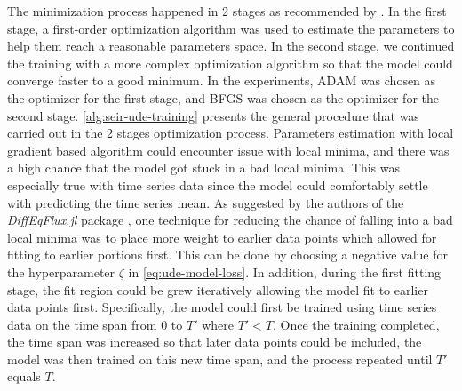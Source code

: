 The minimization process happened in 2 stages as recommended by \cite{rackauckasUniversalDifferentialEquations2020}.
In the first stage, a first-order optimization algorithm was used to estimate the parameters to help them reach a reasonable parameters space.
In the second stage, we continued the training with a more complex optimization algorithm so that the model could converge faster to a good minimum.
In the experiments, ADAM \cite{kingmaAdamMethodStochastic2017} was chosen as the optimizer for the first stage, and BFGS \cite{broydenConvergenceClassDoublerank1970, fletcherNewApproachVariable1970, goldfarbFamilyVariablemetricMethods1970, shannoConditioningQuasiNewtonMethods1970} was chosen as the optimizer for the second stage.
\autoref{alg:seir-ude-training} presents the general procedure that was carried out in the 2 stages optimization process.
Parameters estimation with local gradient based algorithm could encounter issue with local minima, and there was a high chance that the model got stuck in a bad local minima.
This was especially true with time series data since the model could comfortably settle with predicting the time series mean.
As suggested by the authors of the \textit{DiffEqFlux.jl} package \cite{rackauckasUniversalDifferentialEquations2020}, one technique for reducing the chance of falling into a bad local minima was to place more weight to earlier data points which allowed for fitting to earlier portions first.
This can be done by choosing a negative value for the hyperparameter $\zeta$ in \autoref{eq:ude-model-loss}.
In addition, during the first fitting stage, the fit region could be grew iteratively allowing the model fit to earlier data points first.
Specifically, the model could first be trained using time series data on the time span from $0$ to $T'$ where $T' < T$.
Once the training completed, the time span was increased so that later data points could be included, the model was then trained on this new time span, and the process repeated until $T'$ equals $T$.

